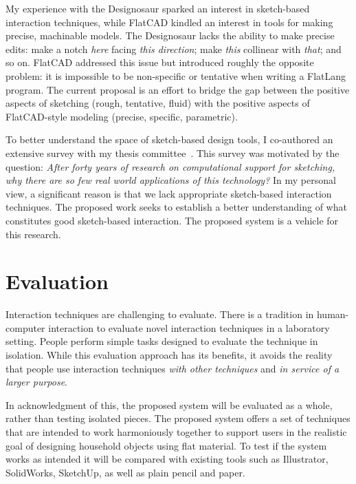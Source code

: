 \documentclass[12pt]{article}
\begin{document}
My experience with the Designosaur sparked an interest in sketch-based
interaction techniques, while FlatCAD kindled an interest in tools for
making precise, machinable models. The Designosaur lacks the ability
to make precise edits: make a notch \textit{here} facing \textit{this
  direction}; make \textit{this} collinear with \textit{that}; and so
on. FlatCAD addressed this issue but introduced roughly the opposite
problem: it is impossible to be non-specific or tentative when writing
a FlatLang program. The current proposal is an effort to bridge the
gap between the positive aspects of sketching (rough, tentative,
fluid) with the positive aspects of FlatCAD-style modeling (precise,
specific, parametric).

To better understand the space of sketch-based design tools, I
co-authored an extensive survey with my thesis
committee~\cite{johnson-sketch-review}. This survey was motivated by
the question: \textit{After forty years of research on computational
  support for sketching, why there are so few real world applications
  of this technology?} In my personal view, a significant reason is
that we lack appropriate sketch-based interaction techniques. The
proposed work seeks to establish a better understanding of what
constitutes good sketch-based interaction. The proposed system is a
vehicle for this research.

\section{Evaluation}

Interaction techniques are challenging to evaluate. There is a
tradition in human-computer interaction to evaluate novel interaction
techniques in a laboratory setting. People perform simple tasks
designed to evaluate the technique in isolation. While this evaluation
approach has its benefits, it avoids the reality that people use
interaction techniques \textit{with other techniques} and \textit{in
  service of a larger purpose}.

In acknowledgment of this, the proposed system will be evaluated as a
whole, rather than testing isolated pieces. The proposed system offers
a set of techniques that are intended to work harmoniously together to
support users in the realistic goal of designing household objects
using flat material. To test if the system works as intended it will
be compared with existing tools such as Illustrator, SolidWorks,
SketchUp, as well as plain pencil and paper. 
\end{document}
